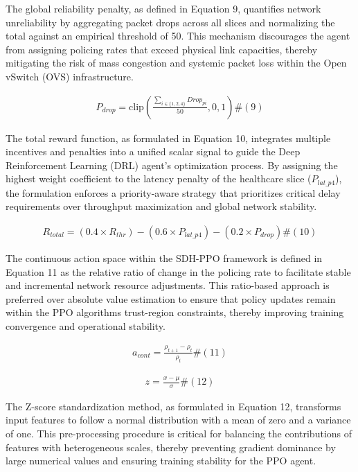 The global reliability penalty, as defined in Equation 9, quantifies network unreliability by aggregating packet drops across all slices and normalizing the total against an empirical threshold of 50. This mechanism discourages the agent from assigning policing rates that exceed physical link capacities, thereby mitigating the risk of mass congestion and systemic packet loss within the Open vSwitch (OVS) infrastructure.

\[\begin{array}{r}
P_{drop} = \text{clip}\left( \frac{\sum_{i \in \text{\{}1,2,4\text{\}}}^{}{Drop_{pi}}}{50},0,1 \right)\#(9)
\end{array}\]

The total reward function, as formulated in Equation 10, integrates multiple incentives and penalties into a unified scalar signal to guide the Deep Reinforcement Learning (DRL) agent's optimization process. By assigning the highest weight coefficient to the latency penalty of the healthcare slice (\(P_{lat\text{\_}p4}\)), the formulation enforces a priority-aware strategy that prioritizes critical delay requirements over throughput maximization and global network stability.

\[\begin{array}{r}
R_{total} = \left( 0.4 \times R_{thr} \right) - \left( 0.6 \times P_{lat\text{\_}p4} \right) - \left( 0.2 \times P_{drop} \right)\#(10)
\end{array}\]

The continuous action space within the SDH-PPO framework is defined in Equation 11 as the relative ratio of change in the policing rate to facilitate stable and incremental network resource adjustments. This ratio-based approach is preferred over absolute value estimation to ensure that policy updates remain within the PPO algorithm\textquotesingle s trust-region constraints, thereby improving training convergence and operational stability.

\[\begin{array}{r}
a_{cont} = \frac{\rho_{t + 1} - \rho_{t}}{\rho_{t}}\#(11)
\end{array}\]

\[\begin{array}{r}
z = \frac{x - \mu}{\sigma}\#(12)
\end{array}\]

The Z-score standardization method, as formulated in Equation 12, transforms input features to follow a normal distribution with a mean of zero and a variance of one. This pre-processing procedure is critical for balancing the contributions of features with heterogeneous scales, thereby preventing gradient dominance by large numerical values and ensuring training stability for the PPO agent.

